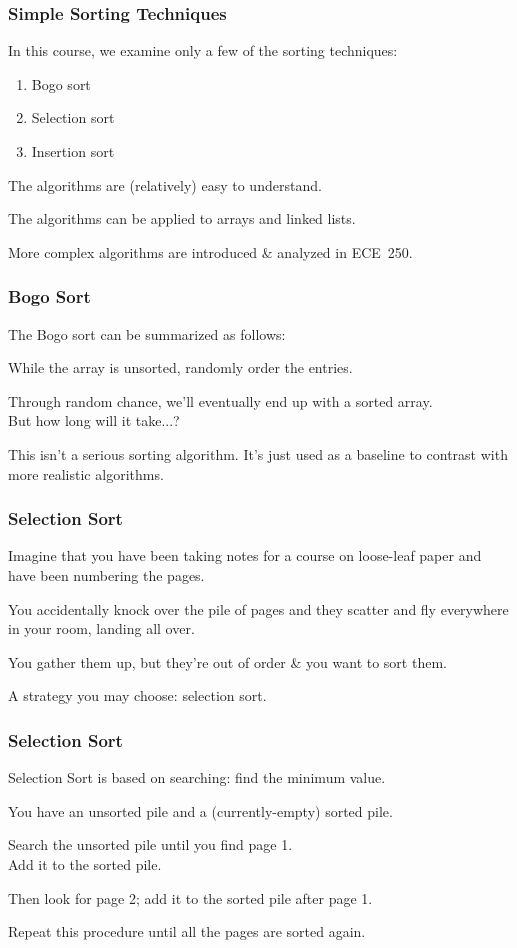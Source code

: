 \begin{frame}
\frametitle{Simple Sorting Techniques}

In this course, we examine only a few of the sorting techniques:
\begin{enumerate}
	\item Bogo sort
	\item Selection sort
	\item Insertion sort
\end{enumerate}

The algorithms are (relatively) easy to understand.

The algorithms can be applied to arrays and linked lists.

More complex algorithms are introduced \& analyzed in ECE~250.

\end{frame}

\begin{frame}
\frametitle{Bogo Sort}
The Bogo sort can be summarized as follows:

While the array is unsorted, randomly order the entries.

Through random chance, we'll eventually end up with a sorted array.\\
\quad But how long will it take...?

This isn't a serious sorting algorithm. It's just used as a baseline to contrast with more realistic algorithms.

\end{frame}

\begin{frame}
\frametitle{Selection Sort}
Imagine that you have been taking notes for a course on loose-leaf paper and have been numbering the pages.

You accidentally knock over the pile of pages and they scatter and fly everywhere in your room, landing all over.

You gather them up, but they're out of order \& you want to sort them.

A strategy you may choose: selection sort.

\end{frame}

\begin{frame}
\frametitle{Selection Sort}
Selection Sort is based on searching: find the minimum value.

You have an unsorted pile and a (currently-empty) sorted pile.

Search the unsorted pile until you find page 1.\\
\quad Add it to the sorted pile.

Then look for page 2; add it to the sorted pile after page 1.

Repeat this procedure until all the pages are sorted again.

\end{frame}


